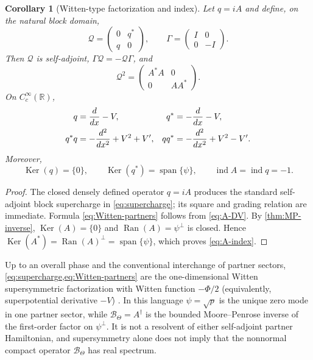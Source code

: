 \documentclass[11pt,reqno]{amsart}
\numberwithin{equation}{section}
\newtheorem{corollary}[corollary]{Corollary}
\newcommand{\R}{\mathbb R}
\newcommand{\1}{\mathbf 1}
\newcommand{\BTheta}{\mathcal B_{\Theta}}
\newcommand{\Ran}{\operatorname{Ran}}
\newcommand{\Ker}{\operatorname{Ker}}
\begin{document}
\begin{corollary}[Witten-type factorization and index]
\label{cor:Witten-factorization}
Let $q=iA$ and define, on the natural block domain,
\begin{equation}\label{eq:supercharge}
 \mathcal Q=
 \begin{pmatrix}0&q^*\\ q&0\end{pmatrix},
 \qquad
 \Gamma=
 \begin{pmatrix}I&0\\0&-I\end{pmatrix}.
\end{equation}
Then $\mathcal Q$ is self-adjoint, $\Gamma\mathcal Q=-\mathcal Q\Gamma$, and
\begin{equation}\label{eq:Witten-Hamiltonian}
 \mathcal Q^2=
 \begin{pmatrix}A^*A&0\\0&AA^*\end{pmatrix}.
\end{equation}
On $C_c^\infty(\R)$,
\begin{align}
 q&=\frac{d}{dx}-V,&q^*&=-\frac{d}{dx}-V,\notag\\
 q^*q&=-\frac{d^2}{dx^2}+V^2+V',&
 qq^*&=-\frac{d^2}{dx^2}+V^2-V'.
 \label{eq:Witten-partners}
\end{align}
Moreover,
\begin{equation}\label{eq:A-index}
 \Ker(q)=\{0\},\qquad
 \Ker(q^*)=\operatorname{span}\{\psi\},\qquad
 \operatorname{ind}A=\operatorname{ind}q=-1.
\end{equation}
\end{corollary}

\begin{proof}
The closed densely defined operator $q=iA$ produces the standard self-adjoint
block supercharge in \eqref{eq:supercharge}; its square and grading relation
are immediate.  Formula \eqref{eq:Witten-partners} follows from
\eqref{eq:A-DV}.  By \cref{thm:MP-inverse}, $\Ker(A)=\{0\}$ and
$\Ran(A)=\psi^\perp$ is closed.  Hence
$\Ker(A^*)=\Ran(A)^\perp=\operatorname{span}\{\psi\}$, which proves
\eqref{eq:A-index}.
\end{proof}

Up to an overall phase and the conventional interchange of partner sectors,
\cref{eq:supercharge,eq:Witten-partners} are the one-dimensional Witten
supersymmetric factorization with Witten function $-\Phi/2$ (equivalently,
superpotential derivative $-V$)
\cite{Witten1982}.  In this language $\psi=\sqrt p$ is the unique zero mode
in one partner sector, while $\BTheta=A^\dagger$ is the bounded
Moore--Penrose inverse of the first-order factor on $\psi^\perp$.  It is not a
resolvent of either self-adjoint partner Hamiltonian, and supersymmetry alone
does not imply that the nonnormal compact operator $\BTheta$ has real
spectrum.
\end{document}
